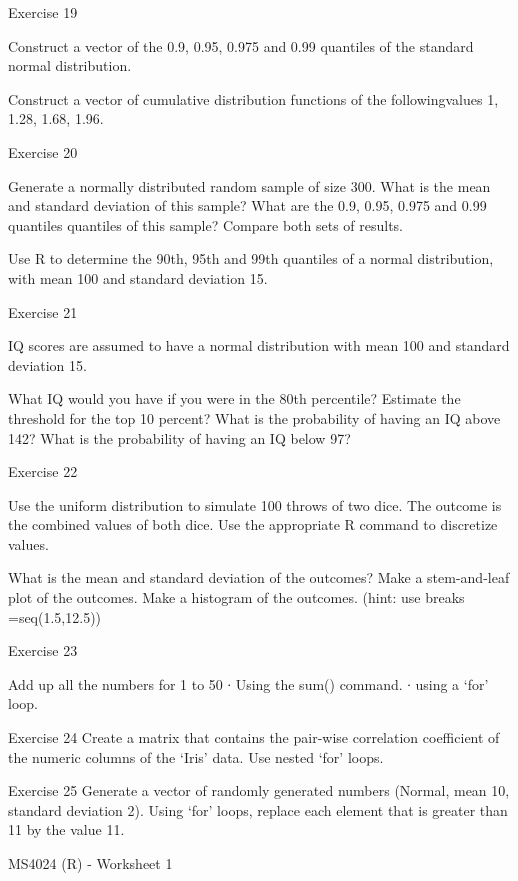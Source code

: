 Exercise 19
 
Construct a vector of the 0.9, 0.95, 0.975 and 0.99 quantiles of the standard normal distribution.
 
Construct a vector of cumulative distribution functions of the followingvalues
1, 1.28, 1.68, 1.96.
 
Exercise 20
 
Generate a normally distributed random sample of size 300. What is the mean and standard deviation of this sample? What are the 0.9, 0.95, 0.975 and 0.99 quantiles quantiles of this sample? Compare both sets of results.
 
Use R to determine the 90th, 95th and 99th quantiles of a normal distribution, with mean 100 and standard deviation 15.
 
Exercise 21
 
IQ scores are assumed to have a normal distribution with mean 100 and standard deviation 15.
 
What IQ would you have if you were in the 80th percentile?
Estimate the threshold for the top 10 percent?
What is the probability of having an IQ above 142?
What is the probability of having an IQ below 97?
 
 
Exercise 22
 
Use the uniform distribution to simulate 100 throws of two dice. The outcome is the combined values of both dice. Use the appropriate R command to discretize values.
 
What is the mean and standard deviation of the outcomes?
Make a stem-and-leaf plot of the outcomes.
Make a histogram of the outcomes. (hint: use breaks =seq(1.5,12.5))
 
Exercise 23
 
Add up all the numbers for 1 to 50
∙       Using the sum() command.
∙       using a ‘for’ loop.
 
Exercise 24
Create a matrix that contains the pair-wise correlation coefficient of the numeric columns of the ‘Iris’ data. Use nested ‘for’ loops.
 
Exercise 25
Generate a vector of randomly generated numbers (Normal, mean 10, standard deviation 2). Using ‘for’ loops, replace each element that is greater than 11 by the value 11.
 



MS4024 (R) - Worksheet 1

